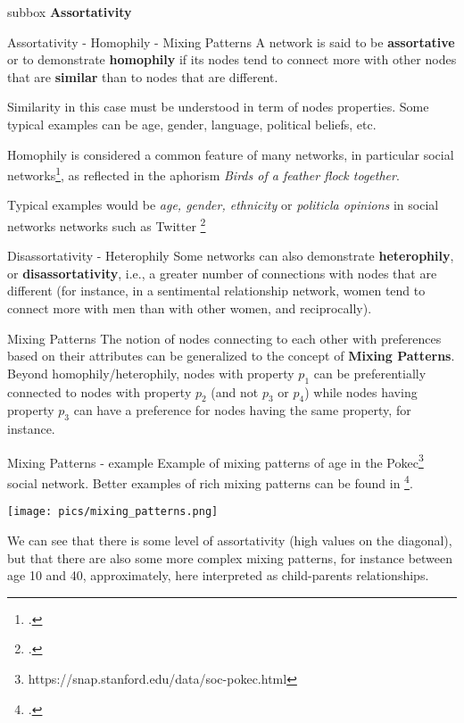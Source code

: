 \begin{subbox}{subbox}{}
    \centering
    \Large{\textbf{Assortativity}}
\end{subbox}


\begin{textbox}{Assortativity - Homophily - Mixing Patterns}
    A network is said to be \textbf{assortative} or to demonstrate \textbf{homophily} if its nodes tend to connect more with other nodes that are \textbf{similar} than to nodes that are different.

    Similarity in this case must be understood in term of nodes properties. Some typical examples can be age, gender, language, political beliefs, etc.

    Homophily is considered a common feature of many networks, in particular social networks\footcite{mcpherson2001birds}, as reflected in the aphorism \textit{Birds of a feather flock together}.

    Typical examples would be \textit{age, gender, ethnicity} or \textit{politicla opinions} in social networks networks such as Twitter \footcite{mcpherson2001birds}
\end{textbox}


\begin{textbox}{Disassortativity - Heterophily}
    Some networks can also demonstrate \textbf{heterophily}, or \textbf{disassortativity}, i.e., a greater number of connections with nodes that are different (for instance, in a sentimental relationship network, women tend to connect more with men than with other women, and reciprocally).
\end{textbox}


\begin{textbox}{Mixing Patterns}
    The notion of nodes connecting to each other with preferences based on their attributes can be generalized to the concept of \textbf{Mixing Patterns}. Beyond homophily/heterophily, nodes with property $p_1$ can be preferentially connected to nodes with property $p_2$ (and not $p_3$ or $p_4$) while nodes having property $p_3$ can have a preference for nodes having the same property, for instance.
\end{textbox}


\begin{textbox}{Mixing Patterns - example}
    Example of mixing patterns of age in the Pokec\footnote{https://snap.stanford.edu/data/soc-pokec.html} social  network. Better examples of rich mixing patterns can be found in \footcite{del2007mixing}.

    \centering
    \texttt{[image: pics/mixing\_patterns.png]}

    We can see that there is some level of assortativity (high values on the diagonal), but that there are also some more complex mixing patterns, for instance between age 10 and 40, approximately, here interpreted as child-parents relationships.
\end{textbox}



